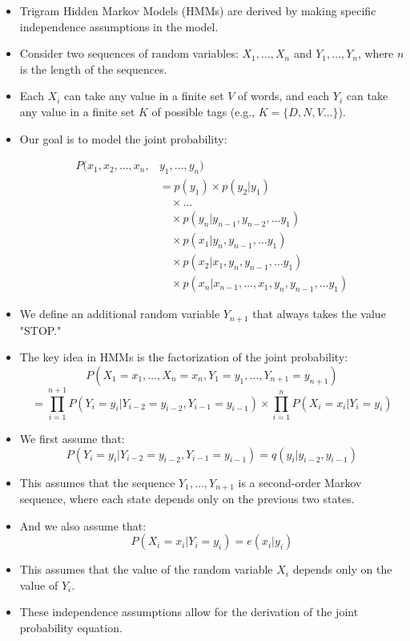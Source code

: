 \begin{itemize}
    \item Trigram Hidden Markov Models (HMMs) are derived by making specific independence assumptions in the model.
    
    \item Consider two sequences of random variables: $X_1, \ldots, X_n$ and $Y_1, \ldots, Y_n$, where $n$ is the length of the sequences.
    
    \item Each $X_i$ can take any value in a finite set $V$ of words, and each $Y_i$ can take any value in a finite set $K$ of possible tags (e.g., $K=\{D,N,V\dots \}$).
    
    \item Our goal is to model the joint probability:

    \begin{align*}
  P(x_1,x_2,\dots,x_n,&y_1,\dots,y_n) \\
  &= p(y_1) \times p(y_2|y_1) \\
  &\quad \times \dots \\
  &\quad \times p(y_n|y_{n-1},y_{n-2},\dots y_1) \\
  &\quad \times p(x_1|y_{n},y_{n-1},\dots y_1) \\
  &\quad \times p(x_2|x_1,y_{n},y_{n-1},\dots y_1) \\
  &\quad \times p(x_n|x_{n-1},\dots,x_1,y_{n},y_{n-1},\dots y_1)
  \end{align*}

    
    \item We define an additional random variable $Y_{n+1}$ that always takes the value "STOP."

  
    \item The key idea in HMMs is the factorization of the joint probability:
    \[P(X_1 = x_1, \ldots, X_n = x_n, Y_1 = y_1, \ldots, Y_{n+1} = y_{n+1})\]
    \[= \prod_{i=1}^{n+1} P(Y_i = y_i | Y_{i-2} = y_{i-2}, Y_{i-1} = y_{i-1}) \times \prod_{i=1}^{n} P(X_i = x_i | Y_i = y_i)\]
    
    \item We first assume that:
    \[P(Y_i = y_i | Y_{i-2} = y_{i-2}, Y_{i-1} = y_{i-1}) = q(y_i | y_{i-2}, y_{i-1})\]
    
    \item This assumes that the sequence $Y_1, \ldots, Y_{n+1}$ is a second-order Markov sequence, where each state depends only on the previous two states.
    
    \item And we also assume that:
      \[P(X_i = x_i | Y_i = y_i) = e(x_i | y_i)\]
    
  \item This assumes that the value of the random variable $X_i$ depends only on the value of $Y_i$.
    
    
    \item These independence assumptions allow for the derivation of the joint probability equation.
    

\end{itemize}



